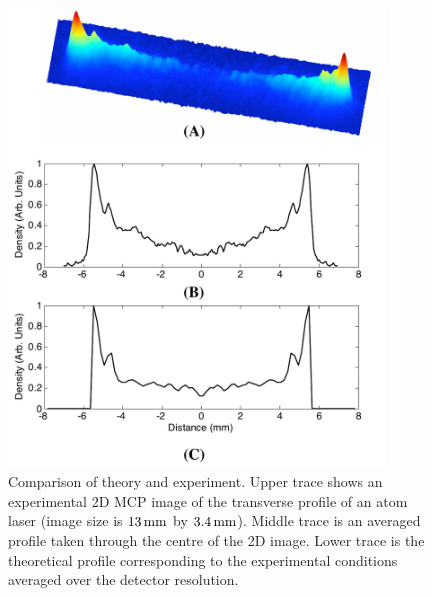 \begin{figure}
    \centering
    \includegraphics[width=10cm]{HeliumTransverseProfileExpTheoryComparison}
    \caption{Comparison of theory and experiment.  Upper trace shows an experimental 2D MCP image of the transverse profile of an atom laser (image size is $\unit[13]{mm}$ by $\unit[3.4]{mm}$).  Middle trace is an averaged profile taken through the centre of the 2D image.  Lower trace is the theoretical profile corresponding to the experimental conditions averaged over the detector resolution.}
    \label{BackgroundTheory:HeliumTransverseProfileExpTheoryComparison}
\end{figure}

